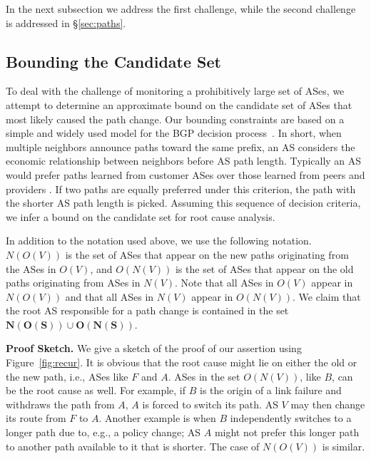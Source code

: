 In the next subsection we address the first challenge, while the second challenge
is addressed in \S \ref{sec:paths}.

\subsection{Bounding the Candidate Set}

To deal with the challenge of monitoring a prohibitively large set of
ASes, we attempt to determine an approximate bound on the candidate set of ASes that 
most likely caused the path change. Our bounding constraints are based on a simple and widely used
model for the BGP decision process~\cite{CaesarR05}.  In short, when multiple
neighbors announce paths toward the same prefix, an AS considers the
economic relationship between neighbors before AS path length.
Typically an AS would prefer paths learned
from customer ASes over those learned from peers and providers . If two paths
are equally preferred under this criterion, the path with the shorter AS path
length is picked. Assuming this sequence of decision criteria, we infer a bound
on the candidate set for root cause analysis.
%

In addition to the notation used above, we use the following notation.
$N(O(V))$ is the set of ASes that appear on the new paths
originating from the ASes in $O(V)$, and $O(N(V))$ is the set of ASes
that appear on the old paths originating from ASes in $N(V)$. 
Note that all ASes in $O(V)$ appear in $N(O(V))$ and that
all ASes in $N(V)$ appear in $O(N(V))$. We claim
that the root AS responsible for a path change is contained in the set 
$\boldsymbol{N(O(S)) \cup O(N(S))}$.

\textbf{Proof Sketch.} We give a sketch of the proof of our assertion
using Figure~\ref{fig:recur}. It is obvious that the root cause might lie on
either the old or the new path, i.e., ASes like $F$ and $A$. ASes in the
set $O(N(V))$, like $B$, can be the root cause as well.
For example, if $B$
is the origin of a link failure and withdraws the path from $A$, $A$ is forced to
switch its path. AS $V$ may then change its route from $F$ to $A$.  
Another example is when $B$ independently switches to a longer path
due to, e.g., a policy change; AS $A$ might not prefer this longer path to another
path available to it that is shorter. The case of $N(O(V))$ is similar.


